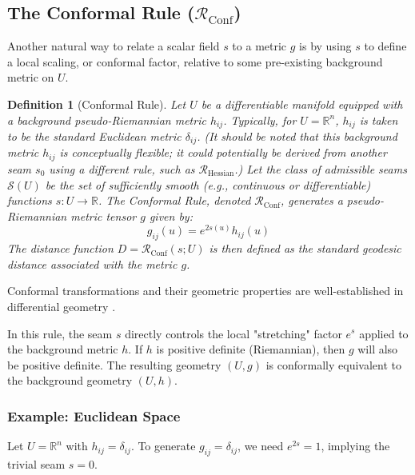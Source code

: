 \documentclass[twoside,twocolumn]{article}
\newtheorem{definition}{Definition}[subsection] %
\begin{document}
\subsection{The Conformal Rule ($\mathcal{R}_{\text{Conf}}$)}
\setcounter{definition}{0}

Another natural way to relate a scalar field $s$ to a metric $g$ is by using $s$ to define a local scaling, or conformal factor, relative to some pre-existing background metric on $U$.

\begin{definition}[Conformal Rule]
Let $U$ be a differentiable manifold equipped with a background pseudo-Riemannian metric $h_{ij}$. Typically, for $U=\mathbb{R}^n$, $h_{ij}$ is taken to be the standard Euclidean metric $\delta_{ij}$. (It should be noted that this background metric $h_{ij}$ is conceptually flexible; it could potentially be derived from another seam $s_0$ using a different rule, such as $\mathcal{R}_{\text{Hessian}}$.) Let the class of admissible seams $\mathcal{S}(U)$ be the set of sufficiently smooth (e.g., continuous or differentiable) functions $s: U \to \mathbb{R}$. The \emph{Conformal Rule}, denoted $\mathcal{R}_{\text{Conf}}$, generates a pseudo-Riemannian metric tensor $g$ given by:
\begin{equation}
g_{ij}(u) = e^{2s(u)} h_{ij}(u)
\label{eq:conformal_rule}
\end{equation}
The distance function $D = \mathcal{R}_{\text{Conf}}(s; U)$ is then defined as the standard geodesic distance associated with the metric $g$.
\end{definition}
Conformal transformations and their geometric properties are well-established in differential geometry \cite{Petersen2006,Lee2018}.

\noindent In this rule, the seam $s$ directly controls the local "stretching" factor $e^s$ applied to the background metric $h$. If $h$ is positive definite (Riemannian), then $g$ will also be positive definite. The resulting geometry $(U, g)$ is conformally equivalent to the background geometry $(U, h)$.

\subsubsection{Example: Euclidean Space}
Let $U = \mathbb{R}^n$ with $h_{ij} = \delta_{ij}$. To generate $g_{ij} = \delta_{ij}$, we need $e^{2s} = 1$, implying the trivial seam $s=0$.
\end{document}
